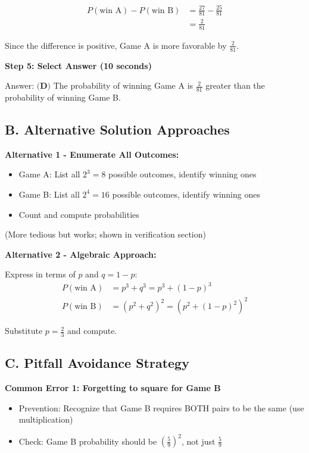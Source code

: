 \documentclass[]{article}
\begin{document}
\begin{solutionbox}
\begin{align*}
P(\text{win A}) - P(\text{win B}) &= \frac{27}{81} - \frac{25}{81}\\
&= \frac{2}{81}
\end{align*}

Since the difference is positive, Game A is more favorable by $\frac{2}{81}$.

\textbf{Step 5: Select Answer (10 seconds)}

Answer: $\boxed{\textbf{(D)}}$ The probability of winning Game A is $\frac{2}{81}$ greater than the probability of winning Game B.

\subsection*{B. Alternative Solution Approaches}

\textbf{Alternative 1 - Enumerate All Outcomes:}

\begin{itemize}[leftmargin=*]
    \item Game A: List all $2^3 = 8$ possible outcomes, identify winning ones
    \item Game B: List all $2^4 = 16$ possible outcomes, identify winning ones
    \item Count and compute probabilities
\end{itemize}

(More tedious but works; shown in verification section)

\textbf{Alternative 2 - Algebraic Approach:}

Express in terms of $p$ and $q = 1-p$:
\begin{align*}
P(\text{win A}) &= p^3 + q^3 = p^3 + (1-p)^3\\
P(\text{win B}) &= (p^2 + q^2)^2 = (p^2 + (1-p)^2)^2
\end{align*}

Substitute $p = \frac{2}{3}$ and compute.

\subsection*{C. Pitfall Avoidance Strategy}

\textbf{Common Error 1: Forgetting to square for Game B}
\begin{itemize}[leftmargin=*]
    \item Prevention: Recognize that Game B requires BOTH pairs to be the same (use multiplication)
    \item Check: Game B probability should be $\left(\frac{5}{9}\right)^2$, not just $\frac{5}{9}$
\end{itemize}


\end{solutionbox}
\end{document}
